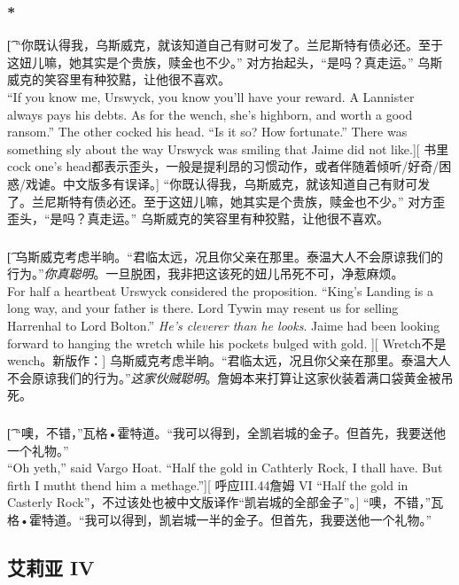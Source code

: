 \documentclass[12pt,a4paper]{article}
\begin{document}
\subsubsection{\color{red}*}\t[	
	“你既认得我，乌斯威克，就该知道自己有财可发了。兰尼斯特有债必还。至于这妞儿嘛，她其实是个贵族，赎金也不少。”
	对方抬起头，“是吗？真走运。”
	乌斯威克的笑容里有种狡黠，让他很不喜欢。\\
	“If you know me, Urswyck, you know you'll have your reward. A Lannister always pays his debts. As for the wench, she's highborn, and worth a good ransom.”
	The other cocked his head. “Is it so? How fortunate.”
	There was something sly about the way Urswyck was smiling that Jaime did not like.][
	书里cock one's head都表示歪头，一般是提利昂的习惯动作，或者伴随着倾听/好奇/困惑/戏谑。中文版多有误译。]
	“你既认得我，乌斯威克，就该知道自己有财可发了。兰尼斯特有债必还。至于这妞儿嘛，她其实是个贵族，赎金也不少。”
	对方歪歪头，“是吗？真走运。”
	乌斯威克的笑容里有种狡黠，让他很不喜欢。
	
\subsubsection{}\t[
	乌斯威克考虑半晌。“君临太远，况且你父亲在那里。泰温大人不会原谅我们的行为。”\emph{你真聪明}。一旦脱困，我非把这该死的妞儿吊死不可，净惹麻烦。\\
	For half a heartbeat Urswyck considered the proposition. “King's Landing is a long way, and your father is there. Lord Tywin may resent us for selling Harrenhal to Lord Bolton.” \emph{He's cleverer than he looks}. Jaime had been looking forward to hanging the wretch while his pockets bulged with gold. ][
	Wretch不是wench。新版作：]
	乌斯威克考虑半晌。“君临太远，况且你父亲在那里。泰温大人不会原谅我们的行为。”\emph{这家伙贼聪明}。詹姆本来打算让这家伙装着满口袋黄金被吊死。
	
\subsubsection{}\label{3.21.6}\t[
	“噢，不错，”瓦格•霍特道。“我可以得到，全凯岩城的金子。但首先，我要送他一个礼物。”\\
	“Oh yeth,” said Vargo Hoat. “Half the gold in Cathterly Rock, I thall have. But firth I mutht thend him a methage.”][
	呼应III.44詹姆 VI “Half the gold in Casterly Rock”，不过该处也被中文版译作“凯岩城的全部金子”。]
	“噢，不错，”瓦格•霍特道。“我可以得到，凯岩城一半的金子。但首先，我要送他一个礼物。”
	
\subsection{艾莉亚 IV}
\end{document}

